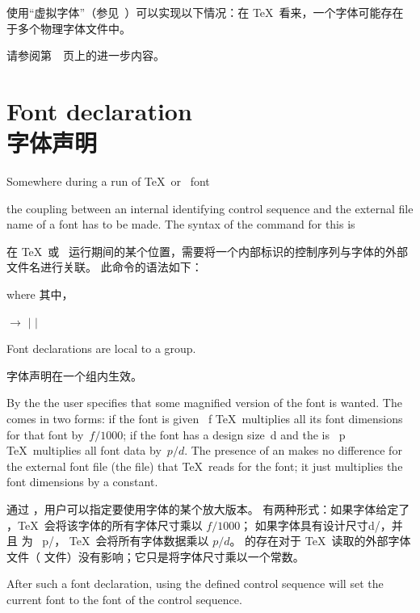 使用“虚拟字体”（参见~\cite{K:virt}）可以实现以下情况：在 \TeX\ 看来，一个字体可能存在于多个物理字体文件中。

请参阅第~\pageref{virtual:fonts}~页上的进一步内容。


\section{Font declaration\\字体声明}

Somewhere during a run of \TeX\ or \IniTeX\ 
\cstoidx font\par
the coupling between an internal identifying control sequence
and the external file name of a font has to be made.
The syntax of the command for this is

在 \TeX\ 或 \IniTeX\ 运行期间的某个位置，需要将一个内部标识的控制序列与字体的外部文件名进行关联。
此命令的语法如下：
\begin{disp}%
\end{disp} 
where 其中，
\begin{disp} $\longrightarrow$  
$|$   $|$ \end{disp}
Font declarations are local to a group.

字体声明在一个组内生效。


By the  the user specifies that some
magnified version of the font is wanted. The  comes
in two forms: if the font is given \n{scaled}~{\italic f\/} \TeX\
multiplies all its font dimensions for that font by~$f/1000$; 
if the font
has a design size~{\italic d\/}\n{pt} and 
the  is ~{\italic p\/}
\TeX\ multiplies all font data by~$p/d$.
The presence of an \gr{at clause} makes no difference for
the external font file (the \n{.tfm} file)
that \TeX\ reads for the font; it just multiplies
the font dimensions by a constant.

通过 ，用户可以指定要使用字体的某个放大版本。
 有两种形式：如果字体给定了 ，\TeX\ 会将该字体的所有字体尺寸乘以 $f/1000$；
如果字体具有设计尺寸{\italic d/}\n{pt}，并且  为 ~{\italic p/}，
\TeX\ 会将所有字体数据乘以 $p/d$。
\gr{at clause} 的存在对于 \TeX\ 读取的外部字体文件（\n{.tfm} 文件）没有影响；它只是将字体尺寸乘以一个常数。


After such a font declaration, using the defined control sequence
will set the current font to the font of the 
control sequence.

